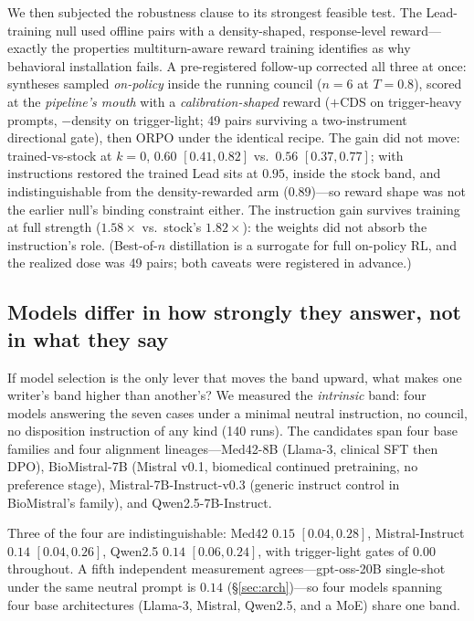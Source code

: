 \documentclass[11pt]{article}
\begin{document}
We then subjected the robustness clause to its strongest feasible test. The
Lead-training null used offline pairs with a density-shaped, response-level
reward---exactly the properties multiturn-aware reward training
\cite{collabllm} identifies as why behavioral installation fails. A
pre-registered follow-up corrected all three at once: syntheses sampled
\emph{on-policy} inside the running council ($n{=}6$ at $T{=}0.8$), scored at
the \emph{pipeline's mouth} with a \emph{calibration-shaped} reward
($+$CDS on trigger-heavy prompts, $-$density on trigger-light; 49 pairs
surviving a two-instrument directional gate), then ORPO under the identical
recipe. The gain did not move: trained-vs-stock at $k{=}0$, $0.60$
$[0.41,0.82]$ vs.\ $0.56$ $[0.37,0.77]$; with instructions restored the
trained Lead sits at $0.95$, inside the stock band, and indistinguishable
from the density-rewarded arm ($0.89$)---so reward shape was not the earlier
null's binding constraint either. The instruction gain survives training at
full strength ($1.58\times$ vs.\ stock's $1.82\times$): the weights did not
absorb the instruction's role. (Best-of-$n$ distillation is a surrogate for
full on-policy RL, and the realized dose was 49 pairs; both caveats were
registered in advance.)

\subsection{Models differ in how strongly they answer, not in what they say}
\label{sec:provenance}
If model selection is the only lever that moves the band upward, what makes
one writer's band higher than another's? We measured the \emph{intrinsic}
band: four models answering the seven cases under a minimal
neutral instruction, no council, no disposition instruction of any kind
(140 runs). The candidates span four base families and four alignment
lineages---Med42-8B (Llama-3, clinical SFT then DPO), BioMistral-7B (Mistral
v0.1, biomedical continued pretraining, no preference stage),
Mistral-7B-Instruct-v0.3 (generic instruct control in BioMistral's family),
and Qwen2.5-7B-Instruct.

Three of the four are indistinguishable: Med42 $0.15$ $[0.04,0.28]$,
Mistral-Instruct $0.14$ $[0.04,0.26]$, Qwen2.5 $0.14$ $[0.06,0.24]$, with
trigger-light gates of $0.00$ throughout. A fifth independent measurement
agrees---gpt-oss-20B single-shot under the same neutral prompt is $0.14$
(\S\ref{sec:arch})---so four models spanning four base architectures
(Llama-3, Mistral, Qwen2.5, and a MoE) share one band.
\end{document}
